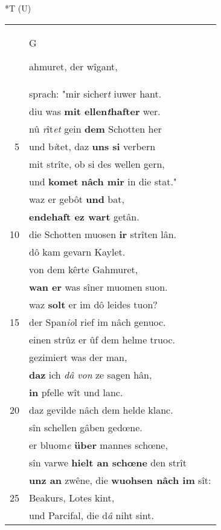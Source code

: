 \documentclass[8pt,a4paper,notitlepage]{article}
\begin{document}
\begin{table}[ht]
\begin{minipage}[t]{0.5\linewidth}
\end{minipage}
\hspace{0.5cm}
\begin{minipage}[t]{0.5\linewidth}
\small
\begin{center}*T (U)
\end{center}
\begin{tabular}{rl}
 & \begin{large}G\end{large}ahmuret, der wîgant,\\ 
 & sprach: "mir sicher\textit{t} iuwer hant.\\ 
 & diu was \textbf{mit ellen\textit{t}hafter} wer.\\ 
 & nû \textit{r}ît\textit{et} gein \textbf{dem} Schotten her\\ 
5 & und b\textit{i}tet, daz \textbf{uns si} verbern\\ 
 & mit strîte, ob si des wellen gern,\\ 
 & und \textbf{komet} \textbf{nâch mir} in die stat."\\ 
 & waz er gebôt \textbf{und} bat,\\ 
 & \textbf{endehaft ez wart} getân.\\ 
10 & die Schotten muosen \textbf{ir} strîten lân.\\ 
 & dô kam gevarn Kaylet.\\ 
 & von dem kêrte Gahmuret,\\ 
 & \textbf{wan er} was sîner muomen suon.\\ 
 & waz \textbf{solt} er im dô leides tuon?\\ 
15 & der Span\textit{io}l rief im nâch genuoc.\\ 
 & einen strûz er ûf dem helme truoc.\\ 
 & gezimiert was der man,\\ 
 & \textbf{daz} ich \textit{dâ von} ze sagen hân,\\ 
 & \textbf{in} pfelle wît und lanc.\\ 
20 & daz gevilde nâch dem helde klanc.\\ 
 & sîn schellen gâben gedœne.\\ 
 & er bluom\textit{e} \textbf{über} mannes schœne,\\ 
 & sîn varwe \textbf{hielt an schœne} den strît\\ 
 & \textbf{unz an} zwêne, die \textbf{wuohsen nâch im} sît:\\ 
25 & Beakurs, Lotes kint,\\ 
 & und Parcifal, die d\textit{â} niht sint.\\ 

\end{tabular}
\end{minipage}
\end{table}
\end{document}
